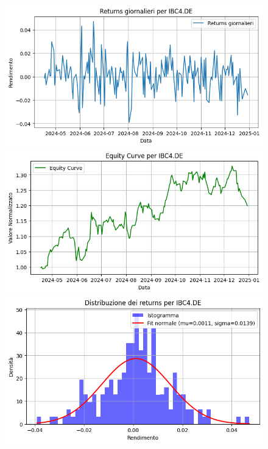 \documentclass{article}%
\begin{document}
\begin{figure}[htbp]%
\begin{minipage}{0.31\textwidth}%
\includegraphics[width=\linewidth]{immagini_tickers/IBC4.DE_returns_plot.png}%
\end{minipage}%
\begin{minipage}{0.31\textwidth}%
\includegraphics[width=\linewidth]{immagini_tickers/IBC4.DE_equity_curve.png}%
\end{minipage}%
\begin{minipage}{0.31\textwidth}%
\includegraphics[width=\linewidth]{immagini_tickers/IBC4.DE_distribuzione_returns.png}%
\end{minipage}%
\end{figure}
\end{document}
